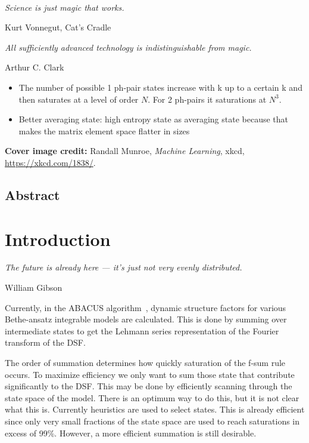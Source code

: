 \documentclass[11pt, a4paper]{report} %
\begin{document}
\newpage
\thispagestyle{empty}

\ 
\vspace{4cm}

\epigraph{\textit{Science is just magic that works.}}{Kurt Vonnegut, Cat's Cradle}

\epigraph{\textit{All sufficiently advanced technology is indistinguishable from magic.}}{Arthur C. Clark}

\begin{itemize}
\item The number of possible 1 ph-pair states increase with k up to a certain k and then saturates at a level of order $N$. For 2 ph-pairs it saturations at $N^3$.
\item Better averaging state: high entropy state as averaging state because that makes the matrix element space flatter in sizes
\end{itemize}

\vfill
\noindent
\textbf{Cover image credit:} Randall Munroe, \textit{Machine Learning}, xkcd, \href{https://xkcd.com/1838/}{https://xkcd.com/1838/}.

\tableofcontents

\newpage

\section*{Abstract}

\chapter{Introduction}

\epigraph{\textit{The future is already here --- it's just not very evenly distributed.}}{William Gibson}

Currently, in the ABACUS algorithm~\cite{Caux2009}, dynamic structure factors for various Bethe-ansatz integrable models are calculated.
This is done by summing over intermediate states to get the Lehmann series representation of the Fourier transform of the DSF.

The order of summation determines how quickly saturation of the f-sum rule occurs.
To maximize efficiency we only want to sum those state that contribute significantly to the DSF.
This may be done by efficiently scanning through the state space of the model.
There is an optimum way to do this, but it is not clear what this is.
Currently heuristics are used to select states.
This is already efficient since only very small fractions of the state space are used to reach saturations in excess of 99\%.
However, a more efficient summation is still desirable.
\end{document}
